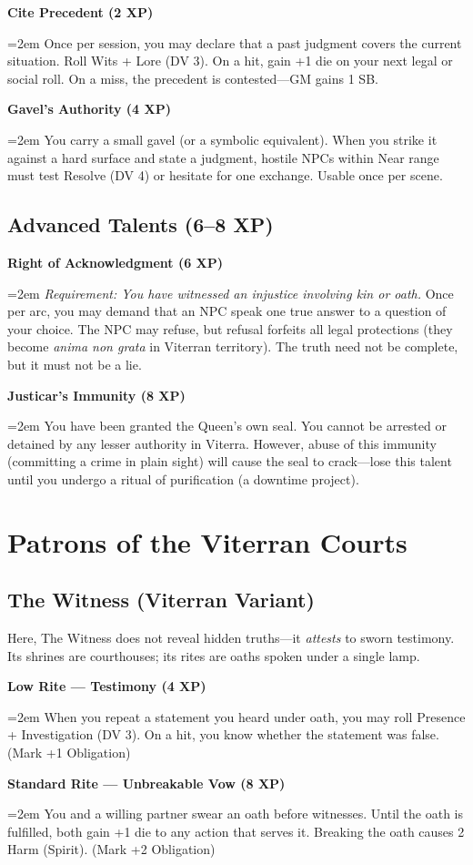 \documentclass[11pt,twoside]{book}
\newcommand{\legalitem}[1]{\par\noindent\textbf{#1}\par\noindent\hangindent=2em\hangafter=1}
\begin{document}
\legalitem{Cite Precedent (2 XP)} Once per session, you may declare that a past judgment covers the current situation. Roll Wits + Lore (DV 3). On a hit, gain +1 die on your next legal or social roll. On a miss, the precedent is contested---GM gains 1 SB.

\legalitem{Gavel's Authority (4 XP)} You carry a small gavel (or a symbolic equivalent). When you strike it against a hard surface and state a judgment, hostile NPCs within Near range must test Resolve (DV 4) or hesitate for one exchange. Usable once per scene.

\section{Advanced Talents (6--8 XP)}

\legalitem{Right of Acknowledgment (6 XP)} \textit{Requirement: You have witnessed an injustice involving kin or oath.} Once per arc, you may demand that an NPC speak one true answer to a question of your choice. The NPC may refuse, but refusal forfeits all legal protections (they become \textit{anima non grata} in Viterran territory). The truth need not be complete, but it must not be a lie.

\legalitem{Justicar's Immunity (8 XP)} You have been granted the Queen's own seal. You cannot be arrested or detained by any lesser authority in Viterra. However, abuse of this immunity (committing a crime in plain sight) will cause the seal to crack---lose this talent until you undergo a ritual of purification (a downtime project).

\chapter{Patrons of the Viterran Courts}

\section{The Witness (Viterran Variant)}

Here, The Witness does not reveal hidden truths---it \textit{attests} to sworn testimony. Its shrines are courthouses; its rites are oaths spoken under a single lamp.

\legalitem{Low Rite --- Testimony (4 XP)} When you repeat a statement you heard under oath, you may roll Presence + Investigation (DV 3). On a hit, you know whether the statement was false. (Mark +1 Obligation)

\legalitem{Standard Rite --- Unbreakable Vow (8 XP)} You and a willing partner swear an oath before witnesses. Until the oath is fulfilled, both gain +1 die to any action that serves it. Breaking the oath causes 2 Harm (Spirit). (Mark +2 Obligation)
\end{document}
